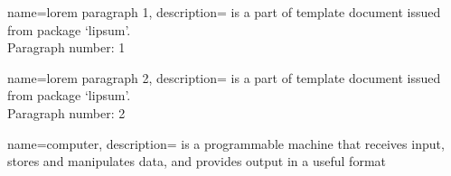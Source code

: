 

{
    name=lorem paragraph 1,
    description=
    {is a part of template document issued from package `lipsum'.\\
    Paragraph number: 1}
}

{
    name=lorem paragraph 2,
    description=
    {is a part of template document issued from package `lipsum'.\\
    Paragraph number: 2}
}

{
    name=computer,
    description=
    {is a programmable machine that receives input,
    stores and manipulates data, and provides
    output in a useful format}
}